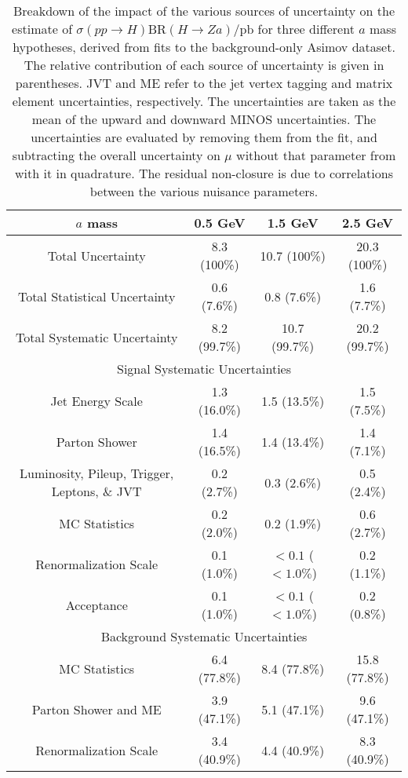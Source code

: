 \documentclass[NOTE, atlasdraft=true, texlive=2017, UKenglish]{\ATLASLATEXPATH atlasdoc}
\begin{document}
\begin{table}[!htbp]{\footnotesize\renewcommand{\arraystretch}{1.25}
  \begin{center}
    \footnotesize
    \begin{tabular}{cccc}
      \toprule
      $a$ mass & 0.5 GeV & 1.5 GeV & 2.5 GeV \\
      \midrule
      Total Uncertainty & 8.3 (100\%) & 10.7 (100\%) & 20.3 (100\%) \\
      Total Statistical Uncertainty & 0.6 (7.6\%) & 0.8 (7.6\%) & 1.6 (7.7\%) \\
      Total Systematic Uncertainty & 8.2 (99.7\%) & 10.7 (99.7\%) & 20.2 (99.7\%) \\
      \midrule
      \multicolumn{4}{c}{Signal Systematic Uncertainties} \\
      \midrule
      Jet Energy Scale & 1.3 (16.0\%) & 1.5 (13.5\%) & 1.5 (7.5\%) \\
      Parton Shower & 1.4 (16.5\%) & 1.4 (13.4\%) & 1.4 (7.1\%) \\
      Luminosity, Pileup, Trigger, Leptons, \& JVT & 0.2 (2.7\%) & 0.3 (2.6\%) & 0.5 (2.4\%) \\
      MC Statistics & 0.2 (2.0\%) & 0.2 (1.9\%) & 0.6 (2.7\%) \\
      Renormalization Scale & 0.1 (1.0\%) & $<0.1$ ($<1.0\%$) & 0.2 (1.1\%) \\
      Acceptance & 0.1 (1.0\%) & $<0.1$ ($<1.0\%$) & 0.2 (0.8\%) \\
      \midrule
      \multicolumn{4}{c}{Background Systematic Uncertainties} \\
      \midrule
      MC Statistics & 6.4 (77.8\%) & 8.4 (77.8\%) & 15.8 (77.8\%) \\
      Parton Shower and ME & 3.9 (47.1\%) & 5.1 (47.1\%) & 9.6 (47.1\%) \\
      Renormalization Scale & 3.4 (40.9\%) & 4.4 (40.9\%) & 8.3 (40.9\%) \\
      \bottomrule
    \end{tabular}
    \caption{Breakdown of the impact of the various sources of uncertainty on the estimate of $\sigma(pp\to H)\text{BR}(H\to Za)/\text{pb}$ for three different $a$ mass hypotheses, derived from fits to the background-only Asimov dataset. The relative contribution of each source of uncertainty is given in parentheses. JVT and ME refer to the jet vertex tagging and matrix element uncertainties, respectively. The uncertainties are taken as the mean of the upward and downward \textsc{MINOS} uncertainties. The uncertainties are evaluated by removing them from the fit, and subtracting the overall uncertainty on $\mu$ without that parameter from with it in quadrature. The residual non-closure is due to correlations between the various nuisance parameters.}
  \label{tab:uncertaintybreakdown}
  \end{center}}
\end{table}
\end{document}
